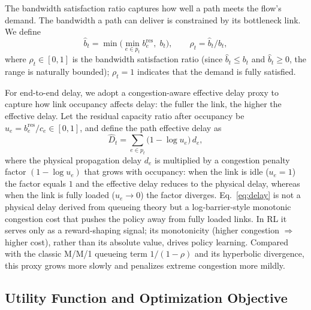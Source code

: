 The bandwidth satisfaction ratio captures how well a path meets the flow's demand. The bandwidth a path can deliver is constrained by its bottleneck link. We define
\begin{equation}
\hat b_t = \min\!\Big(\min_{e\in p_t} b_e^{\text{res}},\; b_t\Big),
\qquad
\rho_t = \hat b_t/b_t,
\label{eq:rho}
\end{equation}
where $\rho_t\in[0,1]$ is the bandwidth satisfaction ratio (since $\hat b_t\le b_t$ and $\hat b_t\ge 0$, the range is naturally bounded); $\rho_t=1$ indicates that the demand is fully satisfied.

For end-to-end delay, we adopt a congestion-aware effective delay proxy to capture how link occupancy affects delay: the fuller the link, the higher the effective delay. Let the residual capacity ratio after occupancy be $u_e = b_e^{\text{res}}/c_e\in[0,1]$, and define the path effective delay as
\begin{equation}
\hat D_t = \sum_{e\in p_t}\big(1-\log u_e\big)\, d_e,
\label{eq:delay}
\end{equation}
where the physical propagation delay $d_e$ is multiplied by a congestion penalty factor $(1-\log u_e)$ that grows with occupancy: when the link is idle ($u_e\!=\!1$) the factor equals $1$ and the effective delay reduces to the physical delay, whereas when the link is fully loaded ($u_e\!\to\!0$) the factor diverges. Eq.~\eqref{eq:delay} is not a physical delay derived from queueing theory but a log-barrier-style monotonic congestion cost that pushes the policy away from fully loaded links. In RL it serves only as a reward-shaping signal; its monotonicity (higher congestion $\Rightarrow$ higher cost), rather than its absolute value, drives policy learning. Compared with the classic M/M/1 queueing term $1/(1-\rho)$ and its hyperbolic divergence, this proxy grows more slowly and penalizes extreme congestion more mildly.

\subsection{Utility Function and Optimization Objective}
\label{sec:problem:objective}

